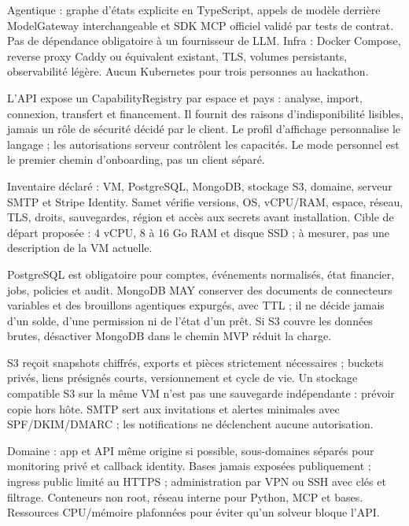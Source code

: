 \documentclass[10pt,a4paper]{article}
\makeatletter
\renewcommand\section{\@startsection{section}{1}{0pt}{16pt plus 2pt minus 1pt}{8pt}{\displayfont\fontsize{16}{20}\selectfont\color{forest}}}
\makeatother
\begin{document}
Agentique : graphe d'états explicite en TypeScript, appels de modèle derrière ModelGateway interchangeable et SDK MCP officiel validé par tests de contrat. Pas de dépendance obligatoire à un fournisseur de LLM. Infra : Docker Compose, reverse proxy Caddy ou équivalent existant, TLS, volumes persistants, observabilité légère. Aucun Kubernetes pour trois personnes au hackathon.\par

L'API expose un CapabilityRegistry par espace et pays : analyse, import, connexion, transfert et financement. Il fournit des raisons d'indisponibilité lisibles, jamais un rôle de sécurité décidé par le client. Le profil d'affichage personnalise le langage ; les autorisations serveur contrôlent les capacités. Le mode personnel est le premier chemin d'onboarding, pas un client séparé.\par

\section{Utilisation de la VM existante}\label{ch:10}
Inventaire déclaré : VM, PostgreSQL, MongoDB, stockage S3, domaine, serveur SMTP et Stripe Identity. Samet vérifie versions, OS, vCPU/RAM, espace, réseau, TLS, droits, sauvegardes, région et accès aux secrets avant installation. Cible de départ proposée : 4 vCPU, 8 à 16 Go RAM et disque SSD ; à mesurer, pas une description de la VM actuelle.\par

PostgreSQL est obligatoire pour comptes, événements normalisés, état financier, jobs, policies et audit. MongoDB MAY conserver des documents de connecteurs variables et des brouillons agentiques expurgés, avec TTL ; il ne décide jamais d'un solde, d'une permission ni de l'état d'un prêt. Si S3 couvre les données brutes, désactiver MongoDB dans le chemin MVP réduit la charge.\par

S3 reçoit snapshots chiffrés, exports et pièces strictement nécessaires ; buckets privés, liens présignés courts, versionnement et cycle de vie. Un stockage compatible S3 sur la même VM n'est pas une sauvegarde indépendante : prévoir copie hors hôte. SMTP sert aux invitations et alertes minimales avec SPF/DKIM/DMARC ; les notifications ne déclenchent aucune autorisation.\par

Domaine : app et API même origine si possible, sous-domaines séparés pour monitoring privé et callback identity. Bases jamais exposées publiquement ; ingress public limité au HTTPS ; administration par VPN ou SSH avec clés et filtrage. Conteneurs non root, réseau interne pour Python, MCP et bases. Ressources CPU/mémoire plafonnées pour éviter qu'un solveur bloque l'API.\par
\end{document}
